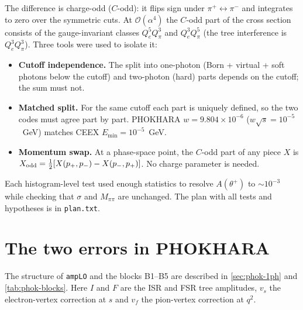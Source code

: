 \documentclass[11pt,a4paper]{article}
\newcommand{\code}[1]{\texttt{#1}}
\newcommand{\phok}{PHOKHARA}
\newcommand{\ceex}{CEEX}
\newcommand{\Ath}{A(\theta^+)}
\begin{document}
The difference is charge-odd ($C$-odd): it flips sign under $\pi^+\leftrightarrow\pi^-$ and
integrates to zero over the symmetric cuts. At $\mathcal O(\alpha^4)$ the $C$-odd part of the
cross section consists of the gauge-invariant classes $Q_e^5Q_\pi^3$ and $Q_e^3Q_\pi^5$ (the tree
interference is $Q_e^3Q_\pi^3$). Three tools were used to isolate it:
\begin{itemize}
\item \textbf{Cutoff independence.} The split into one-photon (Born + virtual + soft photons
  below the cutoff) and two-photon (hard) parts depends on the cutoff; the sum must not.
\item \textbf{Matched split.} For the same cutoff each part is uniquely defined, so the two codes
  must agree part by part. \phok{} $w=9.804\times10^{-6}$ ($w\sqrt s=10^{-5}$~GeV) matches
  \ceex{} $E_{\min}=10^{-5}$~GeV.
\item \textbf{Momentum swap.} At a phase-space point, the $C$-odd part of any piece $X$ is
  $X_{\rm odd}=\tfrac12[X(p_+,p_-)-X(p_-,p_+)]$. No charge parameter is needed.
\end{itemize}
Each histogram-level test used enough statistics to resolve $\Ath$ to $\sim10^{-3}$ while
checking that $\sigma$ and $M_{\pi\pi}$ are unchanged. The plan with all tests and hypotheses
is in \code{plan.txt}.

\section{The two errors in \phok}
\label{sec:bugs}

The structure of \code{ampLO} and the blocks B1--B5 are described in \cref{sec:phok-1ph} and
\cref{tab:phok-blocks}. Here $I$ and $F$ are the ISR and FSR tree amplitudes, $v_s$ the
electron-vertex correction at $s$ and $v_f$ the pion-vertex correction at $q^2$.
\end{document}
